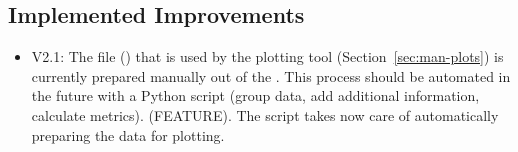 \subsection{Implemented Improvements}

\begin{itemize}
	\item V2.1: The file () that is used by the plotting tool 
	(Section~\ref{sec:man-plots}) is currently prepared manually out of the 
	. This process should be automated in the future with a 
	Python script (group data, add additional information, calculate metrics). 
	(FEATURE). The script  takes now care of automatically preparing the data for plotting.
\end{itemize}